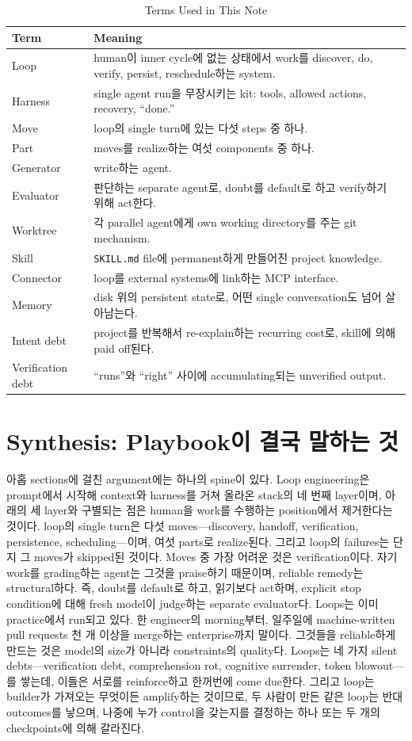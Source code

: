 \documentclass[conference]{IEEEtran}
\begin{document}
\begin{table}[!t]
\centering
\caption{Terms Used in This Note}
\label{tab:7}
\begin{tabularx}{\columnwidth}{@{}lY@{}}
\toprule
Term & Meaning \\
\midrule
Loop & human이 inner cycle에 없는 상태에서 work를 discover, do, verify, persist, reschedule하는 system. \\
Harness & single agent run을 무장시키는 kit: tools, allowed actions, recovery, ``done.'' \\
Move & loop의 single turn에 있는 다섯 steps 중 하나. \\
Part & moves를 realize하는 여섯 components 중 하나. \\
Generator & write하는 agent. \\
Evaluator & 판단하는 separate agent로, doubt를 default로 하고 verify하기 위해 act한다. \\
Worktree & 각 parallel agent에게 own working directory를 주는 git mechanism. \\
Skill & \texttt{SKILL.md} file에 permanent하게 만들어진 project knowledge. \\
Connector & loop를 external systems에 link하는 MCP interface. \\
Memory & disk 위의 persistent state로, 어떤 single conversation도 넘어 살아남는다. \\
Intent debt & project를 반복해서 re-explain하는 recurring cost로, skill에 의해 paid off된다. \\
Verification debt & ``runs''와 ``right'' 사이에 accumulating되는 unverified output. \\
\bottomrule
\end{tabularx}
\end{table}

\section{Synthesis: Playbook이 결국 말하는 것}
아홉 sections에 걸친 argument에는 하나의 spine이 있다. Loop engineering은 prompt에서 시작해 context와 harness를 거쳐 올라온 stack의 네 번째 layer이며, 아래의 세 layer와 구별되는 점은 human을 work를 수행하는 position에서 제거한다는 것이다. loop의 single turn은 다섯 moves---discovery, handoff, verification, persistence, scheduling---이며, 여섯 parts로 realize된다. 그리고 loop의 failures는 단지 그 moves가 skipped된 것이다. Moves 중 가장 어려운 것은 verification이다. 자기 work를 grading하는 agent는 그것을 praise하기 때문이며, reliable remedy는 structural하다. 즉, doubt를 default로 하고, 읽기보다 act하며, explicit stop condition에 대해 fresh model이 judge하는 separate evaluator다. Loops는 이미 practice에서 run되고 있다. 한 engineer의 morning부터, 일주일에 machine-written pull requests 천 개 이상을 merge하는 enterprise까지 말이다. 그것들을 reliable하게 만드는 것은 model의 size가 아니라 constraints의 quality다. Loops는 네 가지 silent debts---verification debt, comprehension rot, cognitive surrender, token blowout---를 쌓는데, 이들은 서로를 reinforce하고 한꺼번에 come due한다. 그리고 loop는 builder가 가져오는 무엇이든 amplify하는 것이므로, 두 사람이 만든 같은 loop는 반대 outcomes를 낳으며, 나중에 누가 control을 갖는지를 결정하는 하나 또는 두 개의 checkpoints에 의해 갈라진다.
\end{document}
